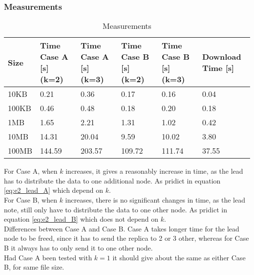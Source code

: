 \subsubsection*{Measurements}
\begin{table}[H]
    \begin{tabularx}{\textwidth}{|X|X|X|X|X|X|}
        \hline
        \cellcolor{lightgray}\textbf{Size} & \cellcolor{lightgray}\textbf{Time Case A [s] (k=2)} & \cellcolor{lightgray}\textbf{Time Case A [s] (k=3)} & \cellcolor{lightgray}\textbf{Time Case B [s] (k=2)} & \cellcolor{lightgray}\textbf{Time Case B [s] (k=3)} & \cellcolor{lightgray}\textbf{Download Time [s]}\\\hline
        10KB  & 0.21    & 0.36   & 0.17   & 0.16   & 0.04  \\\hline
        100KB & 0.46    & 0.48   & 0.18   & 0.20   & 0.18  \\\hline
        1MB   & 1.65    & 2.21   & 1.31   & 1.02   & 0.42  \\\hline
        10MB  & 14.31   & 20.04  & 9.59   & 10.02  & 3.80  \\\hline
        100MB & 144.59  & 203.57 & 109.72 & 111.74 & 37.55 \\\hline
    \end{tabularx}
    \caption{Measurements}
	\label{tab:e2meas}
\end{table}

For Case A, when $k$ increases, it gives a reasonably increase in time, as the lead has to distribute the data to one additional node. As pridict in equation \ref{eq:e2_lead_A} which depend on $k$.\\
For Case B, when $k$ increases, there is no significant changes in time, as the lead note, still only have to distribute the data to one other node. As pridict in equation \ref{eq:e2_lead_B} which does not depend on $k$.\\
Differences between Case A and Case B. Case A takes longer time for the lead node to be freed, since it has to send the replica to 2 or 3 other, whereas for Case B it always has to only send it to one other node.\\
Had Case A been tested with $k=1$ it should give about the same as either Case B, for same file size.